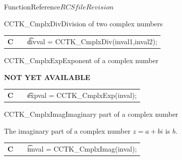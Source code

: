 \begin{cactuspart}{FunctionReference}{$RCSfile$}{$Revision$}
\begin{CCTKFunc}{CCTK\_CmplxDiv}{Division of two complex numbers}
\label{CCTK-CmplxDiv}
\showcargs
\begin{params}
\end{params}
\begin{discussion}
\end{discussion}
\begin{examples}
\begin{tabular}{@{}p{3cm}cp{11cm}}
\hfill {\bf C} && {\t divval = CCTK\_CmplxDiv(inval1,inval2)};
\end{tabular}
\end{examples}
\begin{errorcodes}
\end{errorcodes}
\end{CCTKFunc}


\begin{CCTKFunc}{CCTK\_CmplxExp}{Exponent of a complex number}
\label{CCTK-CmplxExp}
\showcargs
\begin{params}
\end{params}
\begin{discussion}
{\bf NOT YET AVAILABLE}
\end{discussion}
\begin{examples}
\begin{tabular}{@{}p{3cm}cp{11cm}}
\hfill {\bf C} && {\t expval = CCTK\_CmplxExp(inval)};
\end{tabular}
\end{examples}
\begin{errorcodes}
\end{errorcodes}
\end{CCTKFunc}

\begin{CCTKFunc}{CCTK\_CmplxImag}{Imaginary part of a complex number}
\label{CCTK-CmplxImag}
\showcargs
\begin{params}
\end{params}
\begin{discussion}
The imaginary part of a complex number $z=a+bi$ is $b$.
\end{discussion}
\begin{examples}
\begin{tabular}{@{}p{3cm}cp{11cm}}
\hfill {\bf C} && {\t imval = CCTK\_CmplxImag(inval)};
\end{tabular}
\end{examples}
\begin{errorcodes}
\end{errorcodes}
\end{CCTKFunc}


\end{cactuspart}

